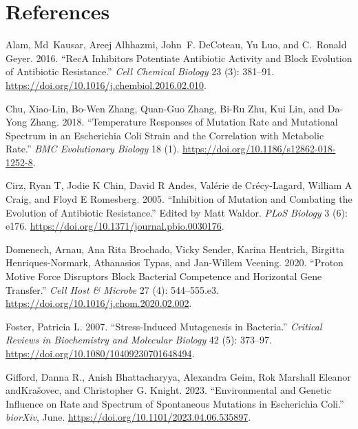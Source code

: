 \documentclass[
  12pt,
  letterpaper,
  DIV=11,
  numbers=noendperiod]{scrreprt}
\newlength{\cslhangindent}
\newlength{\cslentryspacingunit} %
\newenvironment{CSLReferences}[2] %
 {%
  \setlength{\parindent}{0pt}
  \ifodd #1
  \let\oldpar\par
  \def\par{\hangindent=\cslhangindent\oldpar}
  \fi
  \setlength{\parskip}{#2\cslentryspacingunit}
 }%
 {}
\begin{document}
\hypertarget{references}{%
\chapter*{References}\label{references}}


\hypertarget{refs}{}
\begin{CSLReferences}{1}{0}
\leavevmode{}%
Alam, Md~Kausar, Areej Alhhazmi, John~F. DeCoteau, Yu Luo, and C.~Ronald
Geyer. 2016. {``RecA Inhibitors Potentiate Antibiotic Activity and Block
Evolution of Antibiotic Resistance.''} \emph{Cell Chemical Biology} 23
(3): 381--91. \url{https://doi.org/10.1016/j.chembiol.2016.02.010}.

\leavevmode{}%
Chu, Xiao-Lin, Bo-Wen Zhang, Quan-Guo Zhang, Bi-Ru Zhu, Kui Lin, and
Da-Yong Zhang. 2018. {``Temperature Responses of Mutation Rate and
Mutational Spectrum in an Escherichia Coli Strain and the Correlation
with Metabolic Rate.''} \emph{BMC Evolutionary Biology} 18 (1).
\url{https://doi.org/10.1186/s12862-018-1252-8}.

\leavevmode{}%
Cirz, Ryan T, Jodie K Chin, David R Andes, Valérie de Crécy-Lagard,
William A Craig, and Floyd E Romesberg. 2005. {``Inhibition of Mutation
and Combating the Evolution of Antibiotic Resistance.''} Edited by Matt
Waldor. \emph{PLoS Biology} 3 (6): e176.
\url{https://doi.org/10.1371/journal.pbio.0030176}.

\leavevmode{}%
Domenech, Arnau, Ana Rita Brochado, Vicky Sender, Karina Hentrich,
Birgitta Henriques-Normark, Athanasios Typas, and Jan-Willem Veening.
2020. {``Proton Motive Force Disruptors Block Bacterial Competence and
Horizontal Gene Transfer.''} \emph{Cell Host \& Microbe} 27 (4):
544--555.e3. \url{https://doi.org/10.1016/j.chom.2020.02.002}.

\leavevmode{}%
Foster, Patricia L. 2007. {``Stress-Induced Mutagenesis in Bacteria.''}
\emph{Critical Reviews in Biochemistry and Molecular Biology} 42 (5):
373--97. \url{https://doi.org/10.1080/10409230701648494}.

\leavevmode{}%
Gifford, Danna R., Anish Bhattacharyya, Alexandra Geim, Rok Marshall
Eleanor andKrašovec, and Christopher G. Knight. 2023. {``Environmental
and Genetic Influence on Rate and Spectrum of Spontaneous Mutations in
Escherichia Coli.''} \emph{biorXiv}, June.
\url{https://doi.org/10.1101/2023.04.06.535897}.


\end{CSLReferences}
\end{document}

